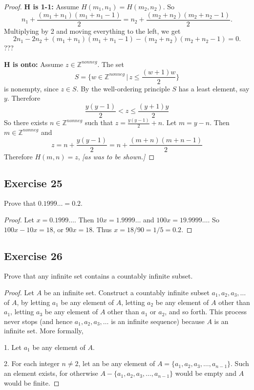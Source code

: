 \documentclass[14pt]{extarticle}
\newcommand{\dps}{\displaystyle}
\newcommand{\Z}{\mathbb{Z}}
\begin{document}
\begin{proof}
    {\bf $\bm{H}$ is 1-1:} Assume \(H(m_1, n_1) = H(m_2, n_2)\). So
    \[
        n_1 + \frac{(m_1 + n_1)(m_1 + n_1 - 1)}{2} = n_2 + \frac{(m_2 + n_2)(m_2 + n_2 - 1)}{2}.
    \]
    Multiplying by 2 and moving everything to the left, we get
    \[
        2n_1 - 2n_2 + (m_1 + n_1)(m_1 + n_1 - 1) - (m_2 + n_2)(m_2 + n_2 - 1) = 0.
    \]
    ???

    {\bf $\bm{H}$ is onto:} Assume \(z \in \Z^{nonneg}\). The set
    \[
        S = \{w \in \Z^{nonneg} \, | \, z \leq \frac{(w+1)w}{2}\}
    \]
    is nonempty, since \(z \in S\). By the well-ordering principle $S$ has a least element, say $y$. Therefore
    \[
        \frac{y(y-1)}{2} < z \leq \frac{(y+1)y}{2}
    \]
    So there exists \(n \in \Z^{nonneg}\) such that \(\dps z = \frac{y(y-1)}{2} + n\). Let \(m = y - n\). Then \(m \in \Z^{nonneg}\) and
    \[
        z = n + \frac{y(y-1)}{2} = n + \frac{(m+n)(m+n-1)}{2}
    \]
    Therefore \(H(m, n) = z\), {\it [as was to be shown.]}
\end{proof}

\subsection{Exercise 25}
Prove that \(0.1999 \ldots = 0.2\).

\begin{proof}
    Let \(x = 0.1999 \ldots\). Then \(10x = 1.9999 \ldots\) and \(100x = 19.9999 \ldots\). So \(100x - 10x = 18\), or
    \(90x = 18\). Thus \(x = 18/90 = 1/5 = 0.2\).
\end{proof}

\subsection{Exercise 26}
Prove that any infinite set contains a countably infinite subset.

\begin{proof}
    Let $A$ be an infinite set. Construct a countably infinite subset \(a_1, a_2, a_3, \ldots\) of $A$, by letting $a_1$
    be any element of $A$, letting $a_2$ be any element of $A$ other than $a_1$, letting $a_3$ be any element of $A$ other
    than $a_1$ or $a_2$, and so forth. This process never stops (and hence \(a_1, a_2, a_3, \ldots\) is an infinite
    sequence) because $A$ is an infinite set. More formally,

    1. Let $a_1$ be any element of $A$.

    2. For each integer \(n \neq 2\), let an be any element of \(A = \{a_1, a_2, a_3, \ldots, a_{n-1}\}\). Such an element
    exists, for otherwise \(A - \{a_1, a_2, a_3, \ldots, a_{n-1}\}\) would be empty and $A$ would be finite.
\end{proof}
\end{document}
